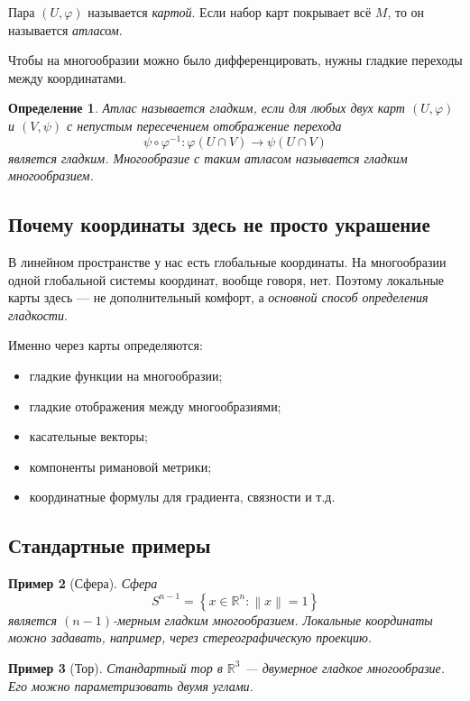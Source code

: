 \documentclass[12pt,a4paper]{article}
\theoremstyle{rudef}
\newtheorem{definition}{Определение}[section]
\newtheorem{example}[definition]{Пример}
\theoremstyle{ruplain}
\newcommand{\R}{\mathbb{R}}
\newcommand{\norm}[1]{\left\lVert #1\right\rVert}
\newcommand{\set}[1]{\left\{#1\right\}}
\begin{document}
Пара $(U,\varphi)$ называется \emph{картой}. Если набор карт покрывает всё $M$, то он называется \emph{атласом}.

Чтобы на многообразии можно было дифференцировать, нужны гладкие переходы между координатами.

\begin{definition}
Атлас называется \emph{гладким}, если для любых двух карт $(U,\varphi)$ и $(V,\psi)$ с непустым пересечением отображение перехода
\[
\psi\circ \varphi^{-1}:\varphi(U\cap V)\to \psi(U\cap V)
\]
является гладким. Многообразие с таким атласом называется \emph{гладким многообразием}.
\end{definition}

\subsection{Почему координаты здесь не просто украшение}

В линейном пространстве у нас есть глобальные координаты. На многообразии одной глобальной системы координат, вообще говоря, нет. Поэтому локальные карты здесь --- не дополнительный комфорт, а \emph{основной способ определения гладкости}.

Именно через карты определяются:
\begin{itemize}
  \item гладкие функции на многообразии;
  \item гладкие отображения между многообразиями;
  \item касательные векторы;
  \item компоненты римановой метрики;
  \item координатные формулы для градиента, связности и т.д.
\end{itemize}

\subsection{Стандартные примеры}

\begin{example}[Сфера]
Сфера
\[
S^{n-1}=\set{x\in \R^n: \norm{x}=1}
\]
является $(n-1)$-мерным гладким многообразием. Локальные координаты можно задавать, например, через стереографическую проекцию.
\end{example}

\begin{example}[Тор]
Стандартный тор в $\R^3$ --- двумерное гладкое многообразие. Его можно параметризовать двумя углами.
\end{example}
\end{document}
